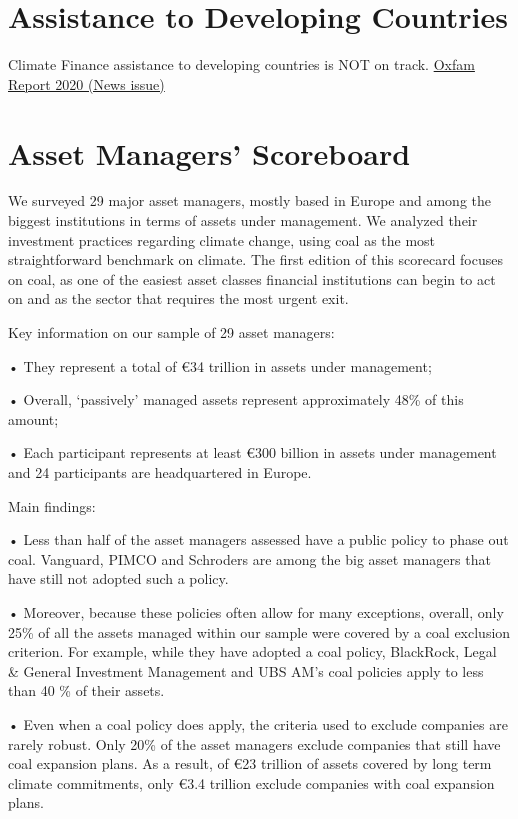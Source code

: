 \documentclass[
]{book}
\begin{document}
\hypertarget{assistance-to-developing-countries}{%
\section{Assistance to Developing Countries}\label{assistance-to-developing-countries}}

Climate Finance assistance to developing countries is NOT on track.
\href{news.html\#climate-finance-shadow-report-2020}{Oxfam Report 2020 (News issue)}

\hypertarget{asset-managers-scoreboard}{%
\section{Asset Managers' Scoreboard}\label{asset-managers-scoreboard}}

We surveyed 29 major asset managers, mostly based in Europe
and among the biggest institutions in terms of assets
under management. We analyzed their investment practices
regarding climate change, using coal as the most straightforward
benchmark on climate. The first edition of this scorecard focuses on
coal, as one of the easiest asset classes financial institutions can begin
to act on and as the sector that requires the most urgent exit.

Key information on our sample of 29 asset managers:

• They represent a total of €34 trillion in assets under
management;

• Overall, `passively' managed assets represent approximately
48\% of this amount;

• Each participant represents at least €300 billion in assets
under management and 24 participants are headquartered
in Europe.

Main findings:

• Less than half of the asset managers assessed have a public policy to phase
out coal. Vanguard, PIMCO and Schroders are among the big asset managers
that have still not adopted such a policy.

• Moreover, because these policies often allow for many exceptions, overall,
only 25\% of all the assets managed within our sample were covered by a
coal exclusion criterion. For example, while they have adopted a coal policy,
BlackRock, Legal \& General Investment Management and UBS AM's coal
policies apply to less than 40 \% of their assets.

• Even when a coal policy does apply, the criteria used to exclude companies
are rarely robust. Only 20\% of the asset managers exclude companies that
still have coal expansion plans. As a result, of €23 trillion of assets covered by
long term climate commitments, only €3.4 trillion exclude companies with
coal expansion plans.
\end{document}
